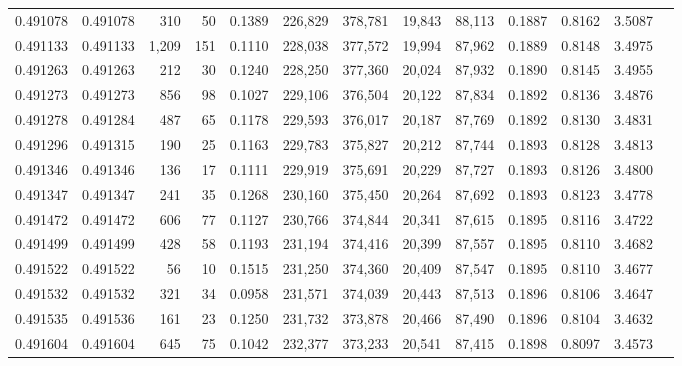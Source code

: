 \begin{tabular}{rrrrrrrrrrrrr}
0.491078 & 0.491078 &   310 &    50 &                                     0.1389 & 226,829 & 378,781 &  19,843 &  88,113 & 0.1887 & 0.8162 & 3.5087 \\
0.491133 & 0.491133 & 1,209 &   151 &                                     0.1110 & 228,038 & 377,572 &  19,994 &  87,962 & 0.1889 & 0.8148 & 3.4975 \\
0.491263 & 0.491263 &   212 &    30 &                                     0.1240 & 228,250 & 377,360 &  20,024 &  87,932 & 0.1890 & 0.8145 & 3.4955 \\
0.491273 & 0.491273 &   856 &    98 &                                     0.1027 & 229,106 & 376,504 &  20,122 &  87,834 & 0.1892 & 0.8136 & 3.4876 \\
0.491278 & 0.491284 &   487 &    65 &                                     0.1178 & 229,593 & 376,017 &  20,187 &  87,769 & 0.1892 & 0.8130 & 3.4831 \\
0.491296 & 0.491315 &   190 &    25 &                                     0.1163 & 229,783 & 375,827 &  20,212 &  87,744 & 0.1893 & 0.8128 & 3.4813 \\
0.491346 & 0.491346 &   136 &    17 &                                     0.1111 & 229,919 & 375,691 &  20,229 &  87,727 & 0.1893 & 0.8126 & 3.4800 \\
0.491347 & 0.491347 &   241 &    35 &                                     0.1268 & 230,160 & 375,450 &  20,264 &  87,692 & 0.1893 & 0.8123 & 3.4778 \\
0.491472 & 0.491472 &   606 &    77 &                                     0.1127 & 230,766 & 374,844 &  20,341 &  87,615 & 0.1895 & 0.8116 & 3.4722 \\
0.491499 & 0.491499 &   428 &    58 &                                     0.1193 & 231,194 & 374,416 &  20,399 &  87,557 & 0.1895 & 0.8110 & 3.4682 \\
0.491522 & 0.491522 &    56 &    10 &                                     0.1515 & 231,250 & 374,360 &  20,409 &  87,547 & 0.1895 & 0.8110 & 3.4677 \\
0.491532 & 0.491532 &   321 &    34 &                                     0.0958 & 231,571 & 374,039 &  20,443 &  87,513 & 0.1896 & 0.8106 & 3.4647 \\
0.491535 & 0.491536 &   161 &    23 &                                     0.1250 & 231,732 & 373,878 &  20,466 &  87,490 & 0.1896 & 0.8104 & 3.4632 \\
0.491604 & 0.491604 &   645 &    75 &                                     0.1042 & 232,377 & 373,233 &  20,541 &  87,415 & 0.1898 & 0.8097 & 3.4573 \\

\end{tabular}
